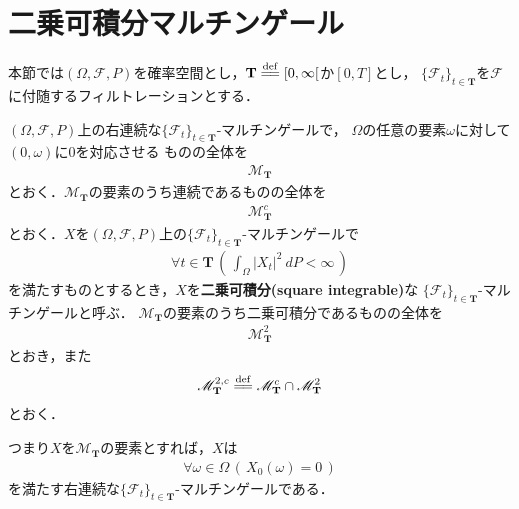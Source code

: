 \section{二乗可積分マルチンゲール}
	本節では$(\Omega,\mathscr{F},P)$を確率空間とし，$\mathbf{T} \defeq [0,\infty[$か$[0,T]$とし，
	$\{\mathscr{F}_t\}_{t \in \mathbf{T}}$を$\mathscr{F}$に付随するフィルトレーションとする．
	
	
	\begin{screen}
		\begin{dfn}[二乗可積分マルチンゲール]
			$(\Omega,\mathscr{F},P)$上の右連続な$\{\mathscr{F}_t\}_{t \in \mathbf{T}}$-マルチンゲールで，
			$\Omega$の任意の要素$\omega$に対して$(0,\omega)$に$0$を対応させる
			ものの全体を
			\begin{align}
				\mathscr{M}_{\mathbf{T}}
			\end{align}
			とおく．$\mathscr{M}_{\mathbf{T}}$の要素のうち連続であるものの全体を
			\begin{align}
				\mathscr{M}^c_{\mathbf{T}}
			\end{align}
			とおく．$X$を$(\Omega,\mathscr{F},P)$上の$\{\mathscr{F}_t\}_{t \in \mathbf{T}}$-マルチンゲールで
			\begin{align}
				\forall t \in \mathbf{T}\, \left(\, \int_\Omega |X_t|^2\ dP < \infty\, \right)
			\end{align}
			を満たすものとするとき，$X$を{\bf 二乗可積分}{\bf (square integrable)}な
			$\{\mathscr{F}_t\}_{t \in \mathbf{T}}$-マルチンゲールと呼ぶ．
			$\mathscr{M}_{\mathbf{T}}$の要素のうち二乗可積分であるものの全体を
			\begin{align}
				\mathscr{M}^2_{\mathbf{T}}
			\end{align}
			とおき，また
			\begin{align}
				\mathscr{M}^{2,c}_{\mathbf{T}} \defeq \mathscr{M}^c_{\mathbf{T}} \cap \mathscr{M}^2_{\mathbf{T}}
			\end{align}
			とおく．
		\end{dfn}
	\end{screen}
	
	つまり$X$を$\mathscr{M}_{\mathbf{T}}$の要素とすれば，$X$は
	\begin{align}
		\forall \omega \in \Omega\, \left(\, X_0(\omega) = 0\, \right)
	\end{align}
	を満たす右連続な$\{\mathscr{F}_t\}_{t \in \mathbf{T}}$-マルチンゲールである．
	
	\begin{screen}
		\begin{thm}[Doobの劣マルチンゲール不等式]
		\end{thm}
	\end{screen}
	
